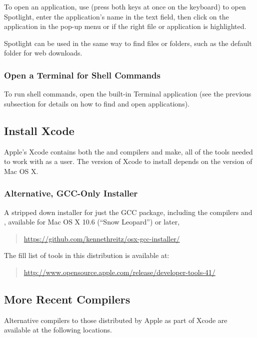 To open an application, use  (press both keys at
once on the keyboard) to open Spotlight, enter the application's name
in the text field, then click on the application in the pop-up menu or
\code{[Return]} if the right file or application is highlighted.

Spotlight can be used in the same way to find files or folders,
such as the default  folder for web downloads.

\subsubsection{Open a Terminal for Shell Commands}

To run shell commands, open the built-in Terminal application (see the
previous subsection for details on how to find and open applications).

\subsection{Install Xcode}

Apple's Xcode contains both the \clang and \gpp compilers and make,
all of the tools needed to work with \CmdStan as a user.  The version
of Xcode to install depends on the version of Mac OS X.

\subsubsection{Alternative, GCC-Only Installer}

A stripped down installer for just the GCC package, including the \Cpp
compilers  and , available for Mac OS X 10.6
(``Snow Leopard'') or later,
%
\begin{quote}
\url{https://github.com/kennethreitz/osx-gcc-installer/}
\end{quote}
%
The fill list of tools in this distribution is available at:
%
\begin{quote}
\url{http://www.opensource.apple.com/release/developer-tools-41/}
\end{quote}


\subsection{More Recent Compilers}

Alternative compilers to those distributed by Apple as part of Xcode
are available at the following locations.

